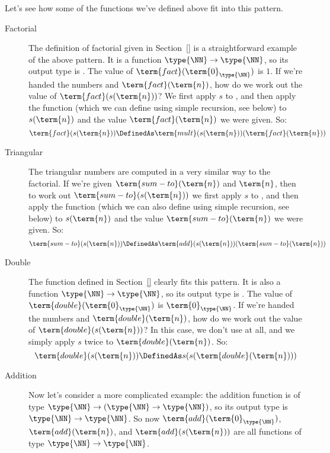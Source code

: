 Let's see how some of the functions we've defined above fit into this pattern.
\begin{description}
\item[Factorial]
The definition of factorial given in Section~\ref{} is a straightforward example of the above pattern.  It is a function $\type{\NN} \to \type{\NN}$, so its output type is \type{\NN}.  The value of $\term{fact}(\term{0}_{\type{\NN}})$ is $1$.  If we're handed the numbers  and $\term{fact}(\term{n})$, how do we work out the value of $\term{fact}(s(\term{n}))$?  We first apply $s$ to , and then apply the function  (which we can define using simple recursion, see below) to 
$s(\term{n})$
and the value
$\term{fact}(\term{n})$ we were given.  So:
\[
\term{fact}(s(\term{n})) \DefinedAs
\term{mult}(s(\term{n}))(\term{fact}(\term{n}))
\]

\item[Triangular]
The triangular numbers are computed in a very similar way to the factorial.  If we're given $\term{sum-to}(\term{n})$ and $\term{n}$, then to work out 
 $\term{sum-to}(s(\term{n}))$ 
we first apply $s$ to , and then apply the function  (which we can also define using simple recursion, see below) to 
$s(\term{n})$
and the value
$\term{sum-to}(\term{n})$ we were given.  So:
\[
\term{sum-to}(s(\term{n})) 
\DefinedAs
\term{add}(s(\term{n}))(\term{sum-to}(\term{n}))
\]

\item[Double]
The function  defined in Section~\ref{} clearly fits this pattern.  It is also a function $\type{\NN} \to \type{\NN}$, so its output type is \type{\NN}.  The value of $\term{double}(\term{0}_{\type{\NN}})$ is $\term{0}_{\type{\NN}}$.  If we're handed the numbers  and $\term{double}(\term{n})$, how do we work out the value of $\term{double}(s(\term{n}))$?  In this case, we don't use  at all, and we simply apply $s$ twice to $\term{double}(\term{n})$.  So:
\[
\term{double}(s(\term{n})) \DefinedAs
s(s(\term{double}(\term{n})))
\]



\item[Addition]
Now let's consider a more complicated example: the addition function  is of type $\type{\NN} \to (\type{\NN} \to \type{\NN})$, so its output type is $\type{\NN} \to \type{\NN}$.  So now $\term{add}(\term{0}_{\type{\NN}})$, 
$\term{add}(\term{n})$, and
$\term{add}(s(\term{n}))$ 
are all functions of type $\type{\NN} \to \type{\NN}$.


\end{description}
